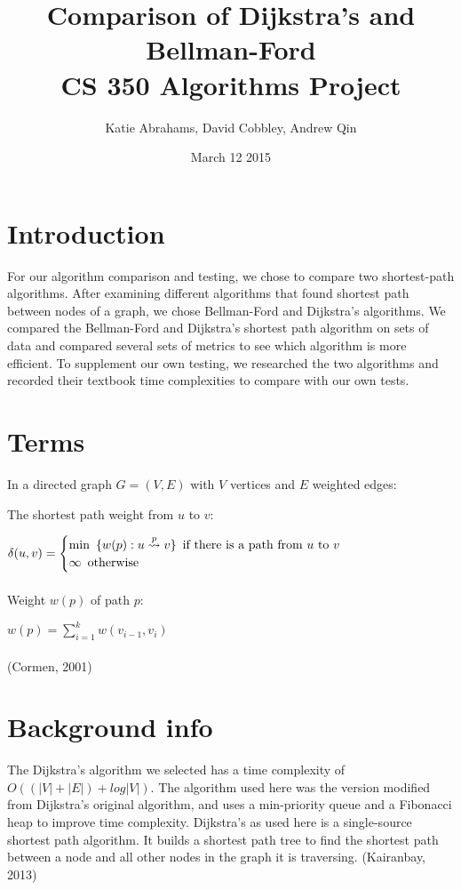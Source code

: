 \documentclass{article}
\title{Comparison of Dijkstra's and Bellman-Ford \\ CS 350 Algorithms Project}
\author{Katie Abrahams, David Cobbley, Andrew Qin}
\date{March 12 2015}
\begin{document}
\maketitle

\section{Introduction}
For our algorithm comparison and testing, we chose to compare two shortest-path algorithms.  After examining different algorithms that found shortest path between nodes of a graph, we chose Bellman-Ford and Dijkstra's algorithms.
We compared the Bellman-Ford and Dijkstra's shortest path algorithm on sets of data and compared several sets of metrics to see which algorithm is more efficient.  To supplement our own testing, we researched the two algorithms and recorded their textbook time complexities to compare with our own tests.

\section{Terms}
In a directed graph $G=(V,E)$ with $V$ vertices and $E$ weighted edges:

The shortest path weight from $u$ to $v$:

$\delta(u,v) = \begin{cases}
\text{min} \hspace{5 pt} \{w(p):u\overset{p}{\leadsto}v\} \hspace{5 pt} \text{if there is a path from $u$ to $v$}\\
\infty \hspace{5 pt} \text{otherwise}
\end{cases}$
\\
\\
Weight $w(p)$ of path $p$:

$w(p)=\displaystyle\sum_{i=1}^{k} w(v_{i-1},v_{i})$
\\
\\
(Cormen, 2001)
\section{Background info}
The Dijkstra's algorithm we selected has a time complexity of $O((|V|+|E|)+log|V|)$.
The algorithm used here was the version modified from Dijkstra's original algorithm, and uses a min-priority queue and a Fibonacci heap to improve time complexity.  Dijkstra's as used here is a single-source shortest path algorithm.  It builds a shortest path tree to find the shortest path between a node and all other nodes in the graph it is traversing. (Kairanbay, 2013)
\end{document}
